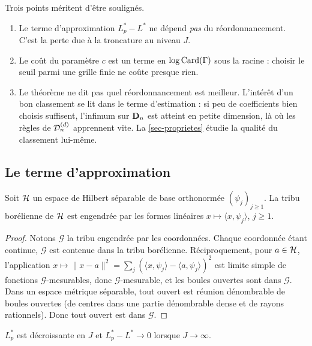 \begin{remarque}\label{rem-oracle-lecture}
Trois points méritent d'être soulignés.
\begin{enumerate}[label=(\alph*)]
  \item Le terme d'approximation $L^*_p-L^*$ ne dépend \emph{pas} du réordonnancement. C'est la perte due à la troncature au niveau $J$.
  \item Le coût du paramètre $c$ est un terme en $\log\operatorname{Card}(\Gamma)$ sous la racine : choisir le seuil parmi une grille finie ne coûte presque rien.
  \item Le théorème ne dit pas quel réordonnancement est meilleur. L'intérêt d'un bon classement se lit dans le terme d'estimation : si peu de coefficients bien choisis suffisent, l'infimum sur $\mathbf{D}_n$ est atteint en petite dimension, là où les règles de $\mathcal{D}_n^{(d)}$ apprennent vite. La \cref{sec-proprietes} étudie la qualité du classement lui-même.
\end{enumerate}
\end{remarque}

\subsection{Le terme d'approximation}

\begin{lemme}\label{lem-borel}
Soit $\mathcal{H}$ un espace de Hilbert séparable de base orthonormée $(\psi_j)_{j\ge1}$. La tribu borélienne de $\mathcal{H}$ est engendrée par les formes linéaires $x\mapsto\langle x,\psi_j\rangle$, $j\ge1$.
\end{lemme}

\begin{proof}
Notons $\mathcal{G}$ la tribu engendrée par les coordonnées. Chaque coordonnée étant continue, $\mathcal{G}$ est contenue dans la tribu borélienne. Réciproquement, pour $a\in\mathcal{H}$, l'application $x\mapsto\|x-a\|^2=\sum_j(\langle x,\psi_j\rangle-\langle a,\psi_j\rangle)^2$ est limite simple de fonctions $\mathcal{G}$-mesurables, donc $\mathcal{G}$-mesurable, et les boules ouvertes sont dans $\mathcal{G}$. Dans un espace métrique séparable, tout ouvert est réunion dénombrable de boules ouvertes (de centres dans une partie dénombrable dense et de rayons rationnels). Donc tout ouvert est dans $\mathcal{G}$.
\end{proof}

\begin{lemme}\label{lem-approximation}
$L^*_p$ est décroissante en $J$ et $L^*_p-L^*\to0$ lorsque $J\to\infty$.
\end{lemme}

